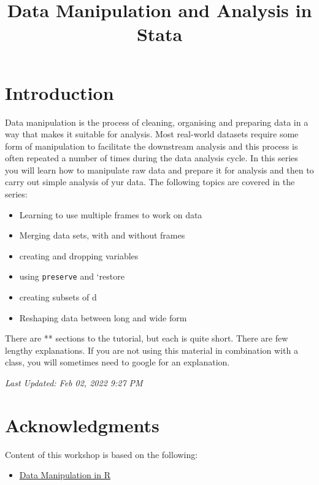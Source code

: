\documentclass[
]{article}
\title{Data Manipulation and Analysis in Stata}
\author{}
\date{\vspace{-2.5em}}
\providecommand{\tightlist}{%
  \setlength{\itemsep}{0pt}\setlength{\parskip}{0pt}}
\begin{document}
\maketitle

{
\setcounter{tocdepth}{2}
\tableofcontents
}
\hypertarget{introduction}{%
\section{Introduction}\label{introduction}}

Data manipulation is the process of cleaning, organising and preparing data in a way that makes it suitable for analysis. Most real-world datasets require some form of manipulation to facilitate the downstream analysis and this process is often repeated a number of times during the data analysis cycle. In this series you will learn how to manipulate raw data and prepare it for analysis and then to carry out simple analysis of yur data. The following topics are covered in the series:

\begin{itemize}
\item
  Learning to use multiple frames to work on data
\item
  Merging data sets, with and without frames
\item
  creating and dropping variables
\item
  using \texttt{preserve} and `restore
\item
  creating subsets of d
\item
  Reshaping data between long and wide form
\end{itemize}

There are ** sections to the tutorial, but each is quite short. There are few lengthy explanations. If you are not using this material in combination with a class, you will sometimes need to google for an explanation.

\emph{Last Updated: Feb 02, 2022 9:27 PM}

\hypertarget{acknowledgments}{%
\section{Acknowledgments}\label{acknowledgments}}

Content of this workshop is based on the following:

\begin{itemize}
\tightlist
\item
  \href{https://firecrest.io/tidydata_tutorial/index.html}{Data Manipulation in R}
\end{itemize}
\end{document}
